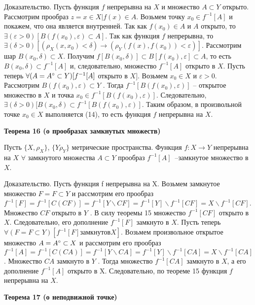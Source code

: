 {Доказательство.
Пусть функция $f$ непрерывна на $X$ и множество $ A \subset Y$ открыто.
Рассмотрим прообраз $z = {x \in X| f (x) \in A}$.
Возьмем точку $x_0 \in f^{-1}[A]$  и  покажем,  что  она  является  внутренней.
Так  как  $f (x_0)  \in A$ и $A$ открыто,
то $\exists(\varepsilon > 0)[ B(f (x_0), \varepsilon) \subset A ]$.
Так как функция $f$  непрерывна,
то $\exists(\delta > 0)
    [ (\rho_X(x, x_0)  <  \delta)  \to (\rho_Y (f (x), f (x_0))  <  \varepsilon) ]$.
Рассмотрим шар $B(x_0, \delta)  \subset X$.
Получим  $f [B(x_0, \delta)]  \subset B[f (x_0), \varepsilon]  \subset A$,
то  есть $B(x_0, \delta) \subset f^{-1}[A]$ и, следовательно, множество $f^{-1}[A]$
открыто в $X$.
Пусть  теперь  $\forall(A  =  A^{\circ}   \subset Y )[ f^{-1}[A]$  открыто в  $X]$.
Возьмем  $x_0  \in X$  и $\varepsilon > 0$. Рассмотрим $B(f (x_0), \varepsilon) \subset Y$ .
Тогда $f^{-1}[ B(f (x_0), \varepsilon) ]$ – открытое множество в $X$ и
точка $x_0 \in f^{-1}[B(f (x_0), \varepsilon)]$.
Следовательно, $\exists(\delta > 0)[ B(x_0, \delta) \subset f^{-1}[B(f (x_0), \varepsilon)]$.
Таким образом, в произвольной точке $x_0 \in X$ выполняется (14),
то есть функция $f$ непрерывна на $X$.


\textbf{Теорема 16 (о прообразах замкнутых множеств)}

Пусть $\{X, \rho_X \}$, $\{Y \rho_Y \}$ метрические пространства. Функция $f:
    X \rightarrow Y$ непрерывна на $X$ \tttk $\forall$ замкнутого множества $A \subset Y$
прообраз $f^{-1}[A]$~--замкнутое множество в $X$.

Доказательство. Пусть функция f непрерывна на X. Возьмем замкнутое множество
$F = F \subset Y$ и рассмотрим его прообраз
$f^{-1}[F ] = f^{-1}[C(CF )] = f^{-1}[Y \backslash CF ] = f^{-1}[Y ]
    \backslash f^{-1}[CF ] = X\backslash f^{-1}[CF ]$.
Множество $CF$  открыто в $Y$ . В силу теоремы 15 множество $f^{-1}[CF ]$ открыто в $X$.
Следовательно, его дополнение $f^{-1}[F ]$ замкнуто в $X$.
Пусть теперь$ \forall(F  = F  \subset Y )[ f^{-1}[F ] замкнуто в X]$.
Возьмем произвольное открытое множество $A = A^{\circ}  \subset X$ и рассмотрим его прообраз
$f^{-1}[A] = f^{-1}[C(CA)] = f^{-1}[Y \backslash CA] = f^{-1}[Y ]\backslash f^{-1}[CA] =
    X\backslash f^{-1}[CA]$.
Множество $CA$ замкнуто в $Y$ . Тогда множество $f^{-1}[CA]$ замкнуто в $X$,
а его дополнение $f^{-1}[A]$ открыто в X. Следовательно, по теореме 15 функция
$f$ непрерывна на $X$.


\textbf{Теорема 17 (о неподвижной точке) }

}
